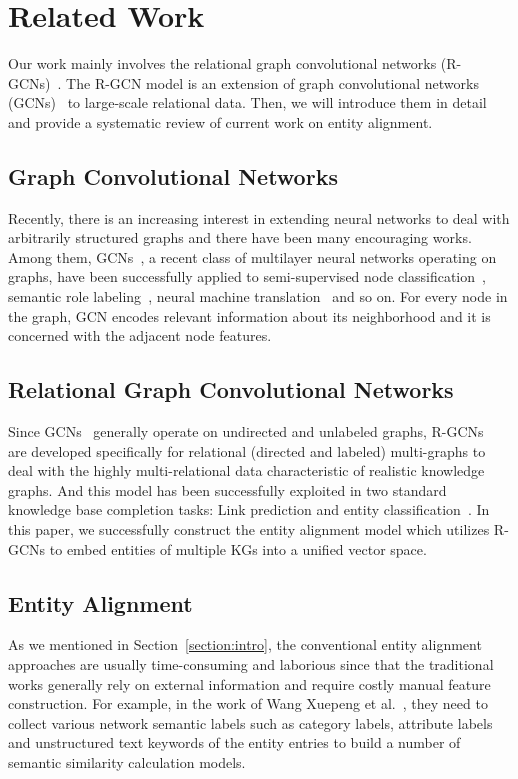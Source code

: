 
	
	\section{Related Work}
	Our work mainly involves the relational graph convolutional networks (R-GCNs)~\cite{Schlichtkrull2017Modeling}. The R-GCN model is an extension of graph convolutional networks (GCNs)~\cite{Kipf2016Semi} to large-scale relational data. Then, we will introduce them in detail and provide a systematic review of current work on entity alignment.
	\subsection*{Graph Convolutional Networks}
	Recently, there is an increasing interest in extending neural networks to deal with arbitrarily structured graphs and there have been many encouraging works. Among them, GCNs~\cite{Duvenaud2015Convolutional,Kipf2016Semi,Kearnes2016Molecular}, a recent class of multilayer neural networks operating on graphs, have been successfully applied to semi-supervised node classification~\cite{Kipf2016Semi}, semantic role labeling~\cite{Marcheggiani2017Encoding}, neural machine translation~\cite{Bastings2017Graph} and so on. For every node in the graph, GCN encodes relevant information about its neighborhood and it is concerned with the adjacent node features. 
	\subsection*{Relational Graph Convolutional Networks}
	Since GCNs~\cite{Kipf2016Semi} generally operate on undirected and unlabeled graphs, R-GCNs~\cite{Schlichtkrull2017Modeling} are developed specifically for relational (directed and labeled) multi-graphs to deal with the highly multi-relational data characteristic of realistic knowledge graphs. And this model has been successfully exploited in two standard knowledge base completion tasks: Link prediction and entity classification~\cite{Schlichtkrull2017Modeling}. In this paper, we successfully construct the entity alignment model which utilizes R-GCNs to embed entities of multiple KGs into a unified vector space.
	
	\subsection*{Entity Alignment}
	
	As we mentioned in Section~\ref{section:intro}, the conventional entity alignment approaches are usually time-consuming and laborious since that the traditional works generally rely on external information and require costly manual feature construction. For example, in the work of Wang Xuepeng et al.~, they need to collect various network semantic labels such as category labels, attribute labels and unstructured text keywords of the entity entries to build a number of semantic similarity calculation models.
	
